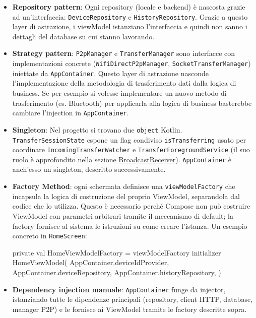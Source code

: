 \begin{itemize}[label={--}, leftmargin=1.2cm]
    \item \textbf{Repository pattern}: Ogni repository (locale e backend) è nascosta grazie ad un'interfaccia: \texttt{DeviceRepository} e \texttt{HistoryRepository}. Grazie a questo layer di astrazione, i viewModel istanziano l'interfaccia e quindi non sanno i dettagli del database su cui stanno lavorando.  

    \item \textbf{Strategy pattern}: \texttt{P2pManager} e \texttt{TransferManager} sono interfacce con implementazioni concrete (\texttt{WifiDirectP2pManager}, \texttt{SocketTransferManager}) iniettate da \texttt{AppContainer}. Questo layer di astrazione nasconde l'implementazione della metodologia di trasferimento dati dalla logica di business. Se per esempio si volesse implementare un nuovo metodo di trasferimento (es. Bluetooth)
    per applicarla alla logica di business basterebbe cambiare l'injection in \texttt{AppContainer}. 

    \item \textbf{Singleton}: Nel progetto si trovano due \texttt{object} Kotlin. \texttt{TransferSessionState} espone un flag condiviso \texttt{isTransferring} usato per coordinare \texttt{Incoming\-Transfer\-Watcher} e \texttt{Transfer\-Foreground\-Service} (il suo ruolo è approfondito nella sezione \hyperref[subsec:broadcast]{BroadcastReceiver}). \texttt{AppContainer} è anch'esso un singleton, descritto successivamente.

    \item \textbf{Factory Method}: ogni schermata definisce una \texttt{viewModelFactory} che incapsula la logica di costruzione del proprio ViewModel, separandola dal codice che lo utilizza. Questo è necessario perché Compose non può costruire ViewModel con parametri arbitrari tramite il meccanismo di default; la factory fornisce al sistema le istruzioni su come creare l'istanza. Un esempio concreto in \texttt{HomeScreen}:

\begin{codeblock}[language=Kotlin]
private val HomeViewModelFactory = viewModelFactory {
    initializer {
        HomeViewModel(
            AppContainer.deviceIdProvider,
            AppContainer.deviceRepository,
            AppContainer.historyRepository,
        )
    }
}
\end{codeblock}

    \item \textbf{Dependency injection manuale}: \texttt{AppContainer} funge da injector, istanziando tutte le dipendenze principali (repository, client HTTP, database, manager P2P) e le fornisce ai ViewModel tramite le factory descritte sopra.
\end{itemize}

